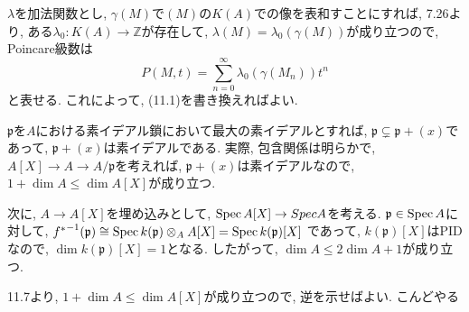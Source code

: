 \documentclass[dvipdfmx]{jsarticle}
\begin{document}
    \begin{problem}

    \end{problem}


    \begin{problem}
        $\lambda$を加法関数とし, $\gamma(M)$で$(M)$の$K(A)$での像を表和すことにすれば,
        7.26より, ある$\lambda_0: K(A) \to \mathbb{Z}$が存在して,
        $\lambda(M) = \lambda_0(\gamma(M))$が成り立つので,
        Poincare級数は
        \[
            P(M, t) = \sum_{n = 0}^\infty \lambda_0(\gamma(M_n))t^n
         \]
         と表せる.
         これによって, (11.1)を書き換えればよい.
    \end{problem}

    \begin{problem}
        $\mathfrak{p}$を$A$における素イデアル鎖において最大の素イデアルとすれば,
        $\mathfrak{p} \subsetneq \mathfrak{p} + (x)$であって, $\mathfrak{p} + (x)$は素イデアルである.
        実際, 包含関係は明らかで, $A[X] \to A \to A/\mathfrak{p}$を考えれば,
        $\mathfrak{p} + (x)$は素イデアルなので, $1 + \dim{A} \leq \dim{A[X]}$が成り立つ.

        次に, $A \to A[X]$を埋め込みとして, $\operatorname{Spec}{A[X]} \to Spec{A}$を考える.
        $\mathfrak{p} \in \operatorname{Spec}{A}$に対して,
        ${f^\ast}^{-1}(\mathfrak{p}) \cong \operatorname{Spec}{k(\mathfrak{p}) \otimes_A A[X]} = \operatorname{Spec}{k(\mathfrak{p})[X]}$
        であって, $k(\mathfrak{p})[X]$はPIDなので,
        $\dim k(\mathfrak{p})[X] = 1$となる.
        したがって,
        $\dim{A} \leq 2 \dim{A} + 1$が成り立つ.
    \end{problem}

    \begin{problem}
        11.7より, $1 + \dim{A} \leq \dim{A[X]}$が成り立つので, 逆を示せばよい.
        \color{red}
            こんどやる
        \color{black}
    \end{problem}
\end{document}
